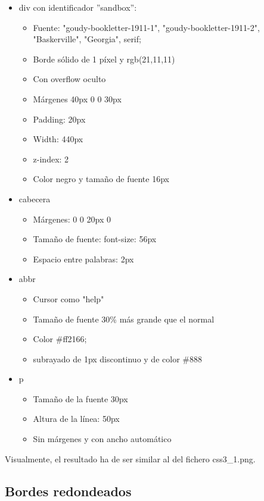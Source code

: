 \begin{itemize}
  \item div con identificador ''sandbox'':
  \begin{itemize}
    \item Fuente: "goudy-bookletter-1911-1", "goudy-bookletter-1911-2", "Baskerville", "Georgia", serif;
    \item Borde sólido de 1 píxel y rgb(21,11,11)
    \item Con overflow oculto
    \item Márgenes 40px 0 0 30px
    \item Padding: 20px
    \item Width: 440px
    \item z-index: 2
    \item Color negro y tamaño de fuente 16px
  \end{itemize}
  \item cabecera
  \begin{itemize}
    \item Márgenes: 0 0 20px 0
    \item Tamaño de fuente: font-size: 56px
    \item Espacio entre palabras: 2px
  \end{itemize}
  \item abbr
  \begin{itemize}
    \item Cursor como "help"
    \item Tamaño de fuente 30\% más grande que el normal
    \item Color \#ff2166;
    \item subrayado de 1px discontinuo y de color \#888
  \end{itemize}
  \item p
  \begin{itemize}
    \item Tamaño de la fuente 30px
    \item Altura de la línea: 50px
    \item Sin márgenes y con ancho automático
  \end{itemize}
\end{itemize}

Visualmente, el resultado ha de ser similar al del fichero css3\_1.png.

\subsection{Bordes redondeados}
\label{subsec:bordes-redondeados}

